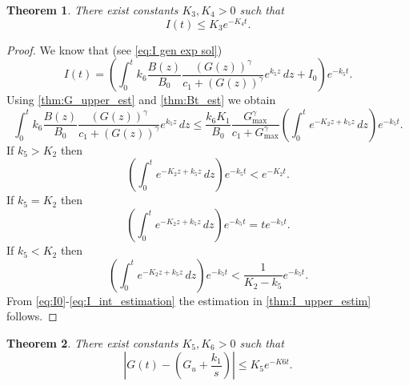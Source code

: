 \documentclass[pdflatex,sn-mathphys-num]{sn-jnl}
\theoremstyle{thmstyleone}
\newtheorem{theorem}{Theorem}[section]
\theoremstyle{thmstyletwo}
\theoremstyle{thmstylethree}
\begin{document}
\begin{theorem}\label{thm:I_upper_estim}
There exist constants $K_3,K_4>0$ such that
\begin{equation*}
I(t)\leq K_3 e^{-K_4 t}.
\end{equation*}
\end{theorem}
\begin{proof}
We know that (see \eqref{eq:I gen exp sol})
\begin{equation}\label{eq:I0}
I(t) =\left(
\int_0^t k_6\frac{B(z)}{B_0}
\frac{(G(z))^{\gamma}}{c_1+(G(z))^{\gamma}}e^{k_5z}\,dz+
I_0
\right)e^{-k_5t}.
\end{equation}
Using \autoref{thm:G_upper_est} and \autoref{thm:Bt_est} we obtain 
\begin{equation}
\int_0^t k_6\frac{B(z)}{B_0}
\frac{(G(z))^{\gamma}}{c_1+(G(z))^{\gamma}}e^{k_5z}\,dz \leq \frac{k_6 K_1}{B_0}
\frac{G_{\max}^{\gamma}}{c_1+G_{\max}^{\gamma}}
\left( \int_0^t e^{-K_2 z+k_5 z}\,dz\right) e^{-k_5 t}. 
\end{equation}
If $k_5>K_2$ then
\begin{equation}
\left( \int_0^t e^{-K_2 z+k_5 z}\,dz\right) e^{-k_5 t}< e^{-K_2 t}.
\end{equation}
If $k_5=K_2$ then
\begin{equation}
\left( \int_0^t e^{-K_2 z+k_5 z}\,dz\right) e^{-k_5 t}=t e^{-k_5 t}.
\end{equation}
If $k_5<K_2$ then
\begin{equation}\label{eq:I_int_estimation}
\left( \int_0^t e^{-K_2 z+k_5 z}\,dz\right) e^{-k_5 t}<\frac{1}{K_2-k_5} e^{-k_5 t}.
\end{equation}
From \eqref{eq:I0}-\eqref{eq:I_int_estimation} the estimation in \autoref{thm:I_upper_estim} follows.
\end{proof}
\begin{theorem}
There exist constants $K_5,K_6>0$ such that 
\begin{equation*}
\left|  G(t)-\left( G_u+\frac{k_1}{s} \right) \right|\leq K_5 e^{-K6 t}.
\end{equation*}
\end{theorem}
\end{document}
